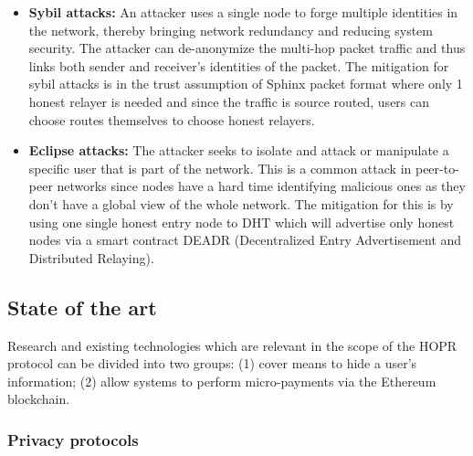 \begin{itemize}
    \item \textbf{Sybil attacks:} An attacker uses a single node to forge
    multiple identities in the network, thereby bringing network redundancy and
    reducing system security. The attacker can de-anonymize the multi-hop packet traffic and thus links both sender and receiver's identities of the packet. The mitigation for sybil attacks is in the trust assumption of Sphinx packet format where only 1 honest relayer is needed and since the traffic is source routed, users can choose routes themselves to choose honest relayers. 
    \item \textbf{Eclipse attacks:} The attacker seeks to isolate and attack or
    manipulate a specific user that is part of the network. This is a common
    attack in peer-to-peer networks since nodes have a hard time identifying
    malicious ones as they don't have a global view of the whole network. The mitigation for this is by using one single honest entry node to DHT which will advertise only honest nodes via a smart contract DEADR (Decentralized Entry Advertisement and Distributed Relaying).
    
\end{itemize}

\subsection{State of the art}
\label{sec:stateoftheart}

Research and existing technologies which are relevant in the scope of the HOPR
protocol can be divided into two groups: (1)  cover
means to hide a user's information; (2)  allow systems
to perform micro-payments via the Ethereum blockchain.

\subsubsection{Privacy protocols}
\label{sec:privacyprotocols}

